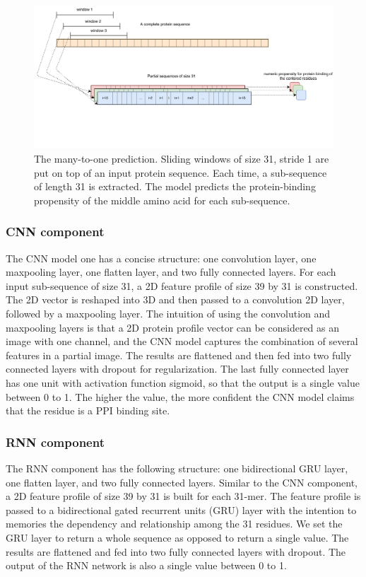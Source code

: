 \begin{figure}
\centering
\includegraphics[width=\textwidth]{img/many_2_one.pdf}
  \caption{The many-to-one prediction. Sliding windows of size 31, stride 1 are put on top of an input protein sequence. Each time, a sub-sequence of length 31 is extracted. The model predicts the protein-binding propensity of the middle amino acid for each sub-sequence.
  \label{fig_many2one}}
\end{figure}
\subsubsection{CNN component}
The CNN model one has a concise structure: one convolution layer, one maxpooling layer, one flatten layer, and two fully connected layers. For each input sub-sequence of size 31, a 2D feature profile of size 39 by 31 is constructed. The 2D vector is reshaped into 3D and then passed to a convolution 2D layer, followed by a maxpooling layer. The intuition of using the convolution and maxpooling layers is that a 2D protein profile vector can be considered as an image with one channel, and the CNN model captures the combination of several features in a partial image. The results are flattened and then fed into two fully connected layers with dropout for regularization. The last fully connected layer has one unit with activation function sigmoid, so that the output is a single value between 0 to 1. The higher the value, the more confident the CNN model claims that the residue is a PPI binding site.
\subsubsection{RNN component}
The RNN component has the following structure: one bidirectional GRU layer, one flatten layer, and two fully connected layers. Similar to the CNN component, a 2D feature profile of size 39 by 31 is built for each 31-mer. The feature profile is passed to a bidirectional gated recurrent units (GRU) layer with the intention to memories the dependency and relationship among the 31 residues. We set the GRU layer to return a whole sequence as opposed to return a single value. The results are flattened and fed into two fully connected layers with dropout. The output of the RNN network is also a single value between 0 to 1.
